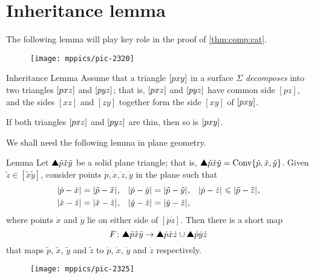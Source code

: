 \section{Inheritance lemma}

The following lemma will play key role in the proof of \ref{thm:comp:cat}.

\begin{wrapfigure}{r}{25mm}
\vskip-0mm
\centering
\texttt{[image: mppics/pic-2320]}
\end{wrapfigure}

\begin{thm}{Inheritance Lemma}
\label{lem:inherit-angle} 
Assume that a triangle $[p{x}{y}]$ in a surface $\Sigma$ \emph{decomposes} 
into two triangles $[p{x}{z}]$ and $[p{y}{z}]$;
that is, $[p{x}{z}]$ and $[p{y}{z}]$ have common side $[p z]$, and the sides $[x z]$ and $[z y]$ together form the side $[x y]$ of $[p{x}{y}]$.

If  both triangles $[p{x}{z}]$ and $[p{y}{z}]$ are thin, 
then so is  $[p{x}{y}]$.
\end{thm} 

We shall need the following lemma in plane geometry.


\begin{thm}{Lemma}\label{lem:quadrangle}
Let $\solidtriangle{\tilde p}{\tilde x}{\tilde y}$ be a solid plane triangle; that is, $\solidtriangle{\tilde p}{\tilde x}{\tilde y}\z=\Conv\{{\tilde p},{\tilde x},{\tilde y}\}$.
Given  $\tilde z\in[\tilde x\tilde y]$,
consider  points $\dot p, \dot x, \dot z, \dot y$ in the plane such that 
\begin{align*}
\dist{\dot p}{\dot x}{}&=\dist{\tilde p}{\tilde x}{},
&
\dist{\dot p}{\dot y}{}&=\dist{\tilde p}{\tilde y}{},
&
\dist{\dot p}{\dot z}{}&\le \dist{\tilde p}{\tilde z}{},
\\
\dist{\dot x}{\dot z}{}&=\dist{\tilde x}{\tilde z}{},
&
\dist{\dot y}{\dot z}{}&=\dist{\tilde y}{\tilde z}{},
\end{align*}
where points $\dot x$ and $\dot y$ lie on either side of $[\dot p\dot z]$.
Then there is a short map 
\[F\:\solidtriangle{\tilde p}{\tilde x}{\tilde y}\to \solidtriangle{\dot p}{\dot x}{\dot z}\cup \solidtriangle{\dot p} {\dot y} {\dot z}\]
that maps $\tilde p$, $\tilde x$, $\tilde y$ and $\tilde z$ to $\dot p$, $\dot x$, $\dot y$ and $\dot z$ respectively.
\end{thm}

\begin{wrapfigure}{r}{45 mm}
\vskip-4mm
\centering
\texttt{[image: mppics/pic-2325]}
\end{wrapfigure}


